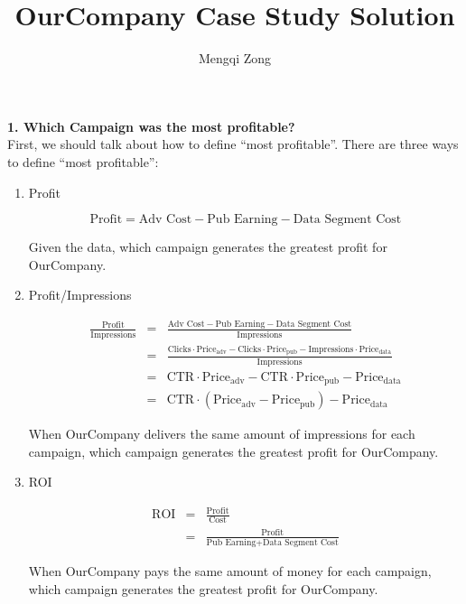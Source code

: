 \documentclass[12pt]{article}
\title{OurCompany Case Study Solution}
\author{Mengqi Zong}
\begin{document}
\maketitle

\setlength{\parindent}{0in}

{\bf 1. Which Campaign was the most profitable?} \\

First, we should talk about how to define ``most profitable''. There are three ways to define ``most profitable'':

\begin{enumerate}
\item Profit

	\begin{equation*}
		\text{Profit} = \text{Adv Cost} - \text{Pub Earning} - \text{Data Segment Cost}
	\end{equation*}

	Given the data, which campaign generates the greatest profit for OurCompany.

\item Profit/Impressions

	\begin{eqnarray*}
		\frac {\text{Profit}}{\text{Impressions}}
		&=& \frac {\text{Adv Cost} - \text{Pub Earning} - \text{Data Segment Cost}}{\text{Impressions}} \\
		&=& \frac {\text{Clicks} \cdot \text{Price}_{\text{adv}} - \text{Clicks} \cdot \text{Price}_{\text{pub}}  - \text{Impressions} \cdot \text{Price}_{\text{data}}}{\text{Impressions}} \\
		&=& \text{CTR} \cdot \text{Price}_{\text{adv}} - \text{CTR} \cdot \text{Price}_{\text{pub}} - \text{Price}_{\text{data}} \\
		&=& \text{CTR} \cdot (\text{Price}_{\text{adv}} - \text{Price}_{\text{pub}}) - \text{Price}_{\text{data}}
	\end{eqnarray*}

	When OurCompany delivers the same amount of impressions for each campaign, which campaign generates the greatest profit for OurCompany.
	
\item ROI

	\begin{eqnarray*}
		\text{ROI} &=& \frac {\text{Profit}} {\text{Cost}} \\
				   &=& \frac {\text{Profit}} {\text{Pub Earning} + \text{Data Segment Cost}}
	\end{eqnarray*}
	
	When OurCompany pays the same amount of money for each campaign, which campaign generates the greatest profit for OurCompany.
\end{enumerate}
\end{document}
